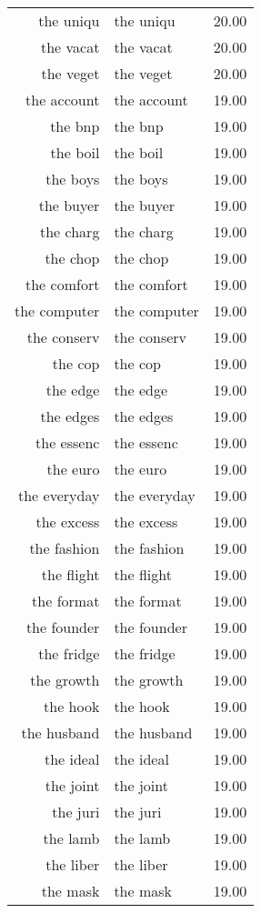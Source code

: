 \begin{table}[ht]
\begin{tabular}{rlr}
  the uniqu & the uniqu & 20.00 \\ 
  the vacat & the vacat & 20.00 \\ 
  the veget & the veget & 20.00 \\ 
  the account & the account & 19.00 \\ 
  the bnp & the bnp & 19.00 \\ 
  the boil & the boil & 19.00 \\ 
  the boys & the boys & 19.00 \\ 
  the buyer & the buyer & 19.00 \\ 
  the charg & the charg & 19.00 \\ 
  the chop & the chop & 19.00 \\ 
  the comfort & the comfort & 19.00 \\ 
  the computer & the computer & 19.00 \\ 
  the conserv & the conserv & 19.00 \\ 
  the cop & the cop & 19.00 \\ 
  the edge & the edge & 19.00 \\ 
  the edges & the edges & 19.00 \\ 
  the essenc & the essenc & 19.00 \\ 
  the euro & the euro & 19.00 \\ 
  the everyday & the everyday & 19.00 \\ 
  the excess & the excess & 19.00 \\ 
  the fashion & the fashion & 19.00 \\ 
  the flight & the flight & 19.00 \\ 
  the format & the format & 19.00 \\ 
  the founder & the founder & 19.00 \\ 
  the fridge & the fridge & 19.00 \\ 
  the growth & the growth & 19.00 \\ 
  the hook & the hook & 19.00 \\ 
  the husband & the husband & 19.00 \\ 
  the ideal & the ideal & 19.00 \\ 
  the joint & the joint & 19.00 \\ 
  the juri & the juri & 19.00 \\ 
  the lamb & the lamb & 19.00 \\ 
  the liber & the liber & 19.00 \\ 
  the mask & the mask & 19.00 \\ 

\end{tabular}
\end{table}
